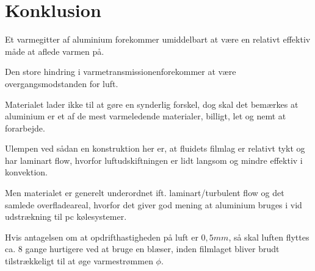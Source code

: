 \section{Konklusion}

Et varmegitter af aluminium forekommer umiddelbart at være en relativt effektiv måde at aflede varmen på. 

Den store hindring i varmetransmissionenforekommer at være overgangsmodstanden for luft. 

Materialet lader ikke til at gøre en synderlig forskel, dog skal det bemærkes at aluminium er et af de mest varmeledende materialer, billigt, let og nemt at forarbejde.

Ulempen ved sådan en konstruktion her er, at fluidets filmlag er relativt tykt og har laminart flow, hvorfor luftudskiftningen er lidt langsom og mindre effektiv i konvektion. 

Men materialet er generelt underordnet ift. laminart/turbulent flow og det samlede overfladeareal, hvorfor det giver god mening at aluminium bruges i vid udstrækning til pc kølesystemer. 

Hvis antagelsen om at opdrifthastigheden på luft er $0,5mm$, så skal luften flyttes ca. 8 gange hurtigere ved at bruge en blæser, inden filmlaget bliver brudt tilstrækkeligt til at øge varmestrømmen $\phi$.